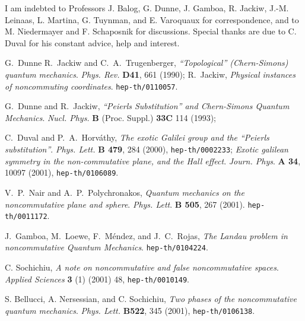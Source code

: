 \documentclass[a4paper,11pt]{article}
\def\parag{\hfil\break} %
\def\kikezd{\parag\underbar}
\begin{document}
  \kikezd{\bf Acknowledgement.}
I am indebted to Professors
J. Balog, G. Dunne, J. Gamboa, R. Jackiw, J.-M. Leinaas, L. Martina,
G. Tuynman, and E. Varoquaux for correspondence,
  and to M. Niedermayer and F. Schaposnik for discussions.
  Special thanks are due to C. Duval for his
  constant advice, help and interest.


\begin{thebibliography}{99}

G.~Dunne R.~Jackiw and C.~A.~Trugenberger,
{\it ``Topological'' (Chern-Simons) quantum mechanics}.
{\sl Phys. Rev.} {\bf D41},  661 (1990);
R.~Jackiw, {\it Physical instances of noncommuting coordinates}.
\texttt{hep-th/0110057}.

G.~Dunne and R.~Jackiw,
  {\it ``Peierls Substitution'' and Chern-Simons Quantum Mechanics}.
{\sl Nucl. Phys.} {\bf B} (Proc. Suppl.) {\bf 33C} 114 (1993);

C.~Duval and P.~A.~Horv\'athy,
  {\it The exotic Galilei group and the ``Peierls substitution''}.
{\sl Phys. Lett.} {\bf B 479}, 284 (2000),
  \texttt{hep-th/0002233};
  {\it Exotic galilean symmetry in the non-commutative plane, and the
Hall effect}.
{\sl Journ. Phys}. {\bf A 34}, 10097 (2001), \texttt{hep-th/0106089}.

V.~P.~Nair and A.~P.~Polychronakos,
{\it Quantum mechanics on the noncommutative plane and sphere}.
{\sl  Phys. Lett}. {\bf B 505}, 267 (2001).
\texttt{hep-th/0011172}.

J.~Gamboa, M.~Loewe, F.~M\'endez, and J.~C.~Rojas,
{\it The Landau problem in noncommutative Quantum Mechanics}.
\texttt{hep-th/0104224}.

C. Sochichiu,
{\it A note on noncommutative and false noncommutative spaces}.
{\sl Applied Sciences} {\bf 3} (1) (2001) 48, \texttt{hep-th/0010149}.

S. Bellucci, A. Nersessian, and C. Sochichiu,
{\it Two phases of the noncommutative quantum mechanics}.
{\sl Phys. Lett.} {\bf B522}, 345 (2001),
\texttt{hep-th/0106138}.



\end{thebibliography}
\end{document}
